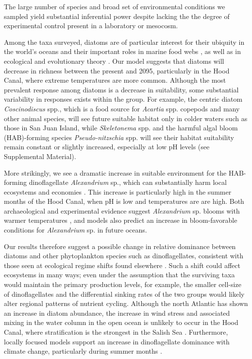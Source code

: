 \documentclass[11pt]{article}
\begin{document}
\begin{linenumbers}
The large number of species and broad set of environmental conditions we sampled yield substantial inferential power despite lacking the the degree of experimental control present in a laboratory or mesocosm. 


Among the taxa surveyed, diatoms are of particular interest for their ubiquity in the world's oceans and their important roles in marine food webs \cite{armbrust2009life, wasmund2017diatom}, as well as in ecological and evolutionary theory \cite{margalef11978}. Our model suggests that diatoms will decrease in richness between the present and 2095, particularly in the Hood Canal, where extreme temperatures are more common. Although the most prevalent response among diatoms is a decrease in suitability, some substantial variability in responses exists within the group. For example, the centric diatom \textit{Coscinodiscus} spp., which is a food source for \textit{Acartia} spp. copepods \cite{jansen2008copepods} and many other animal species, will see future suitable habitat only in colder waters such as those in San Juan Island, while \textit{Skeletonema} spp. and the harmful algal bloom (HAB)-forming species \textit{Pseudo-nitzschia} spp. will see their habitat suitability remain constant or slightly increased, especially at low pH levels (see Supplemental Material).

More strikingly, we see a dramatic increase in suitable environment for the HAB-forming dinoflagellate \textit{Alexandrium} sp., which can substantially harm local ecosystems \cite{colin2002latitudinal} and economies \cite{anderson2000estimated}. This increase is particularly high in the summer months of the Hood Canal, when pH is low and temperatures are are high. Both archaeological and experimental evidence suggest \textit{Alexandrium} sp. blooms with warmer temperatures \cite{mudie2002palynological}, and models \cite{moore2015present} also predict an increase in bloom-favorable conditions for \textit{Alexandrium} sp. in future oceans. 

 Our results therefore suggest a possible change in relative dominance between diatoms and other phytoplankton species such as dinoflagellates, consistent with those seen at ecological regime shifts found elsewhere \cite{wasmund2017diatom, hinder2012changes}. Such a shift could affect ecosystems in many ways; even under the assumption that the surviving taxa would maintain the primary production levels, for example, the smaller cell-size of dinoflagellates and the differential sinking rates of the two groups would likely alter regional patterns of nutrient cycling\cite{xiao2018warming, anderson2002harmful, bienfang1984sinking}. Although the north Atlantic has shown an increase in diatom abundance\cite{hinder2012changes}, the increase in wind stress and associated mixing in the water column in the open ocean is unlikely to occur in the Hood Canal, where stratification is the strongest in the Salish Sea \cite{moore2008descriptive}. Furthermore, locally focused models support an increase in dinoflagellate dominance with climate change, particularly during summer months \cite{khangaonkar2019salish}.
 

\end{linenumbers}
\end{document}
